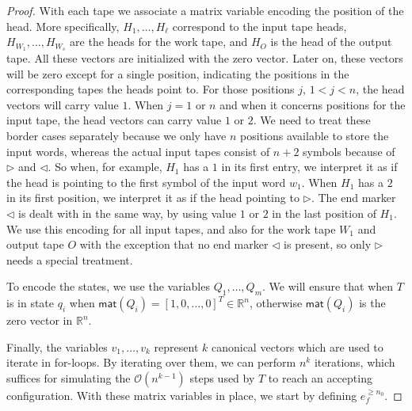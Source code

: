 \begin{proof}
\smallskip
    With each tape we associate a matrix variable encoding the position of the head. More specifically, 
    $H_1,\ldots,H_\ell$ correspond to the input tape heads,
    $H_{W_1},\ldots, H_{W_s}$ are the heads for the work tape, and $H_O$ is the head of the output tape. 
    All these vectors are initialized with the zero vector. Later on, these vectors will be zero except 
    for a single position, indicating the positions in the corresponding tapes the heads point to. 
    For those positions $j$, $1<j<n$, the head vectors will carry value $1$.  When $j=1$ or $n$ and when 
    it concerns positions for the input tape, the head vectors can carry value $1$ or $2$. We need to treat 
    these border cases separately
    because we only have $n$ positions available to store the input words, whereas the actual input tapes 
    consist of $n+2$ symbols because of $\rhd$ and $\lhd$. So when, for example, $H_1$ has a $1$ in its first
    entry, we interpret it as if the head is pointing to the first symbol of the input word $w_1$. When $H_1$
    has a $2$ in its first position, we interpret it as if the head pointing to $\rhd$. The end marker $\lhd$ is
    dealt with in the same way, by using value $1$ or $2$ in the last position of $H_1$. We use this encoding
    for all input tapes, and also for the work tape $W_1$ and output tape $O$ with the exception that no end 
    marker $\lhd$ is present, so only $\rhd$ needs a special treatment.


    To encode the states, we use the variables $Q_1,\ldots,Q_m$. We will ensure that when $T$ is in state 
    $q_i$ when
    $\mathsf{mat}(Q_i)=[1,0,\ldots,0]^T\in\mathbb{R}^n$, otherwise $\mathsf{mat}(Q_i)$ is the zero 
    vector in $\mathbb{R}^n$.	

    Finally, the variables $v_1,\ldots,v_{k}$ represent $k$ canonical vectors  which are used to iterate 
    in for-loops. By iterating over them, we can perform $n^{k}$ iterations, 
    which suffices for simulating the $\mathcal{O}(n^{k-1})$ steps used by $T$ to reach an accepting configuration.
    With these matrix variables in place, we start by defining $e_f^{\geq n_0}$.


\end{proof}
